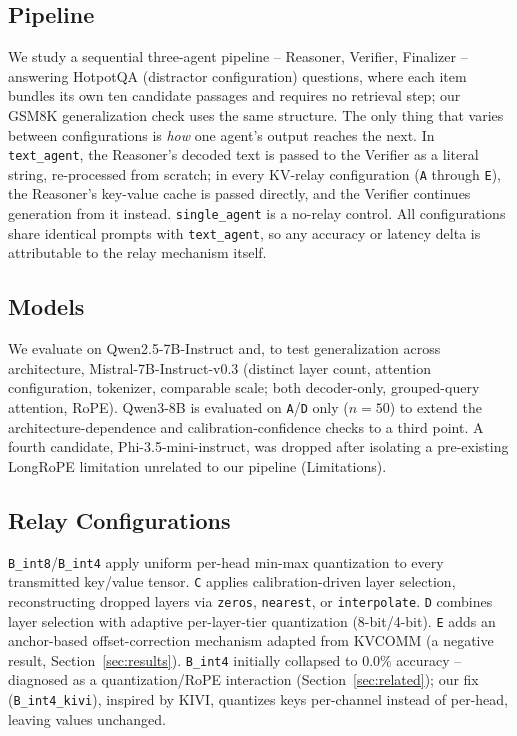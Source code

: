 \documentclass[11pt]{article}
\begin{document}
\subsection{Pipeline}
We study a sequential three-agent pipeline -- Reasoner, Verifier,
Finalizer -- answering HotpotQA \citep{hotpotqa2018} (distractor
configuration) questions, where each item bundles its own ten candidate
passages and requires no retrieval step; our GSM8K \citep{gsm8k2021}
generalization check uses the same structure. The only thing that varies
between configurations is \emph{how} one agent's output reaches the next.
In \texttt{text\_agent}, the Reasoner's decoded text is passed to the
Verifier as a literal string, re-processed from scratch; in every
KV-relay configuration (\texttt{A} through \texttt{E}), the Reasoner's
key-value cache is passed directly, and the Verifier continues generation
from it instead. \texttt{single\_agent} is a no-relay control. All
configurations share identical prompts with \texttt{text\_agent}, so any
accuracy or latency delta is attributable to the relay mechanism itself.

\subsection{Models}
We evaluate on Qwen2.5-7B-Instruct \citep{qwen2p5_2024} and, to test
generalization across architecture, Mistral-7B-Instruct-v0.3
\citep{mistral7b2023} (distinct layer count, attention configuration,
tokenizer, comparable scale; both decoder-only, grouped-query attention,
RoPE). Qwen3-8B is evaluated on \texttt{A}/\texttt{D} only ($n=50$) to
extend the architecture-dependence and calibration-confidence checks to a
third point. A fourth candidate, Phi-3.5-mini-instruct, was dropped after
isolating a pre-existing LongRoPE limitation unrelated to our pipeline
(Limitations).

\subsection{Relay Configurations}
\texttt{B\_int8}/\texttt{B\_int4} apply uniform per-head min-max
quantization to every transmitted key/value tensor. \texttt{C} applies
calibration-driven layer selection, reconstructing dropped layers via
\texttt{zeros}, \texttt{nearest}, or \texttt{interpolate}. \texttt{D}
combines layer selection with adaptive per-layer-tier quantization
(8-bit/4-bit). \texttt{E} adds an anchor-based offset-correction
mechanism adapted from KVCOMM (a negative result, Section~\ref{sec:results}).
\texttt{B\_int4} initially collapsed to 0.0\% accuracy -- diagnosed as a
quantization/RoPE interaction (Section~\ref{sec:related}); our fix
(\texttt{B\_int4\_kivi}), inspired by KIVI, quantizes keys per-channel
instead of per-head, leaving values unchanged.
\end{document}
